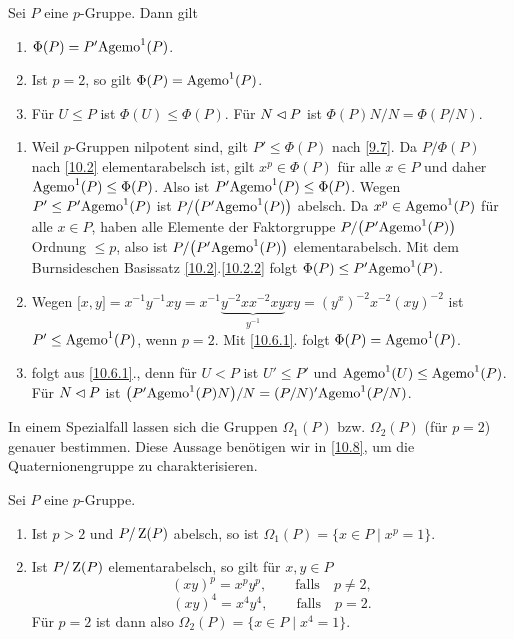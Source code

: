 \begin{satz}
 Sei $P$ eine $p$-Gruppe. Dann gilt
\begin{enumerate}
 \item \label{10.6.1}$\Phi(P)=P'\text{Agemo}^1(P)$.
 \item Ist $p=2$, so gilt $\Phi(P)=\text{Agemo}^1(P)$.
 \item F\"ur $U\leq P$ ist $\Phi(U)\leq \Phi(P)$. F\"ur $N\lhd P$ ist $\Phi(P)N/N=\Phi(P/N)$.
\end{enumerate}

\end{satz}

\begin{beweis}\spspace
 \begin{enumerate}
 \item Weil $p$-Gruppen nilpotent sind, gilt $P'\leq \Phi(P)$ nach \ref{9.7}. Da $P/\Phi(P)$ nach \ref{10.2} elementarabelsch ist, gilt $x^p\in \Phi(P)$ f\"ur alle $x\in P$ und daher $\text{Agemo}^1(P)\leq \Phi(P)$. Also ist $P'\text{Agemo}^1(P)\leq \Phi(P)$. Wegen $P'\leq P'\text{Agemo}^1(P)$ ist $P/\bigl(P'\text{Agemo}^1(P)\bigr)$ abelsch. Da $x^p\in \text{Agemo}^1(P)$ f\"ur alle $x\in P$, haben alle Elemente der Faktorgruppe $P/\bigl(P'\text{Agemo}^1(P)\bigr)$ Ordnung $\leq p$, also ist $P/\bigl(P'\text{Agemo}^1(P)\bigr)$ elementarabelsch. Mit dem Burnsideschen Basissatz \ref{10.2}.\ref{10.2.2} folgt $\Phi(P)\leq P'\text{Agemo}^1(P)$.
 \item Wegen $\lbrack x,y\rbrack=x^{-1}y^{-1}xy=x^{-1}\underbrace{y^{-2}xx^{-2}xy}_{y^{-1}}xy=(y^x)^{-2}x^{-2}(xy)^{-2}$ ist $P'\leq \text{Agemo}^1(P)$, wenn $p=2$. Mit \ref{10.6.1}. folgt $\Phi(P)=\text{Agemo}^1(P)$.
\item folgt aus \ref{10.6.1}., denn f\"ur $U<P$ ist $U'\leq P'$ und $\text{Agemo}^1(U)\leq\text{Agemo}^1(P)$. F\"ur $N\lhd P$ ist $\bigl(P'\text{Agemo}^1(P)N\bigr)/N=(P/N)'\text{Agemo}^1(P/N)$.
\end{enumerate}

\end{beweis}
 In einem Spezialfall lassen sich die Gruppen $\Omega_1(P)$ bzw. $\Omega_2(P)$ (f\"ur $p=2$) genauer bestimmen. Diese Aussage ben\"otigen wir in \ref{10.8}, um die Quaternionengruppe zu charakterisieren.
\begin{satz}\label{10.7}
 Sei $P$ eine $p$-Gruppe.
\begin{enumerate}
 \item Ist $p>2$ und $P/\operatorname{Z}(P)$ abelsch, so ist $\Omega_1(P)=\lbrace x\in P\mid x^p=1\rbrace$.
 \item \label{10.7.1}Ist $P/\operatorname{Z}(P)$ elementarabelsch, so gilt f\"ur $x,y\in P$
$$(xy)^p=x^py^p,\qquad \text{falls}\quad p\neq 2,$$
$$(xy)^4=x^4y^4,\qquad \text{falls}\quad p=2.$$
F\"ur $p=2$ ist dann also $\Omega_2(P)=\lbrace x\in P\mid x^4=1\rbrace$.
\end{enumerate}

\end{satz}

